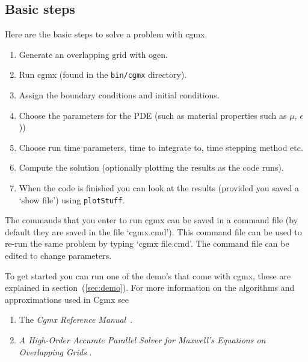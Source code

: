 \documentclass{article}
\newcommand{\Index}[1]{#1\index{#1}}
\begin{document}
\subsection{Basic steps}
Here are the basic steps to solve a problem with cgmx.
\begin{enumerate}
  \item Generate an overlapping grid with ogen. 
  \item Run cgmx (found in the {\tt bin/cgmx} directory).
  \item Assign the boundary conditions and initial conditions.
  \item Choose the parameters for the PDE (such as material properties such as $\mu$, $\epsilon$))
  \item Choose run time parameters, time to integrate to, time stepping method etc.
  \item Compute the solution (optionally plotting the results as the code runs).
  \item When the code is finished you can look at the results (provided you saved a
     `show file') using {\tt plotStuff}.
\end{enumerate}
The commands that you enter to run cgmx can be saved in a \Index{command file} (by default
they are saved in the file `cgmx.cmd'). This command file can be used to re-run
the same problem by typing `cgmx file.cmd'. The command file can be edited to change parameters.

To get started you can run one of the demo's that come with cgmx, these are 
explained in section~(\ref{sec:demo}).
% 
For more information on the algorithms and approximations used in Cgmx see
\begin{enumerate}
  \item The {\sl Cgmx Reference Manual}~\cite{CgmxReferenceManual}.
  \item {\sl A High-Order Accurate Parallel Solver for {Maxwell}'s Equations on Overlapping Grids}
        \cite{max2006b}.
\end{enumerate}

  
\end{document}
